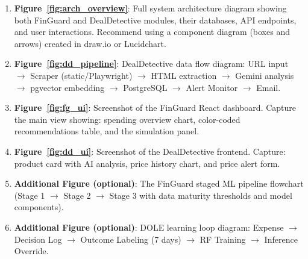 \documentclass[]{IEEEtran}
\begin{document}
\begin{enumerate}
    \item \textbf{Figure~\ref{fig:arch_overview}}: Full system architecture diagram showing both FinGuard and DealDetective modules, their databases, API endpoints, and user interactions. Recommend using a component diagram (boxes and arrows) created in draw.io or Lucidchart.
    
    \item \textbf{Figure~\ref{fig:dd_pipeline}}: DealDetective data flow diagram: URL input $\rightarrow$ Scraper (static/Playwright) $\rightarrow$ HTML extraction $\rightarrow$ Gemini analysis $\rightarrow$ pgvector embedding $\rightarrow$ PostgreSQL $\rightarrow$ Alert Monitor $\rightarrow$ Email.
    
    \item \textbf{Figure~\ref{fig:fg_ui}}: Screenshot of the FinGuard React dashboard. Capture the main view showing: spending overview chart, color-coded recommendations table, and the simulation panel.
    
    \item \textbf{Figure~\ref{fig:dd_ui}}: Screenshot of the DealDetective frontend. Capture: product card with AI analysis, price history chart, and price alert form.
    
    \item \textbf{Additional Figure (optional)}: The FinGuard staged ML pipeline flowchart (Stage 1 $\rightarrow$ Stage 2 $\rightarrow$ Stage 3 with data maturity thresholds and model components).
    
    \item \textbf{Additional Figure (optional)}: DOLE learning loop diagram: Expense $\rightarrow$ Decision Log $\rightarrow$ Outcome Labeling (7 days) $\rightarrow$ RF Training $\rightarrow$ Inference Override.
\end{enumerate}
\end{document}
